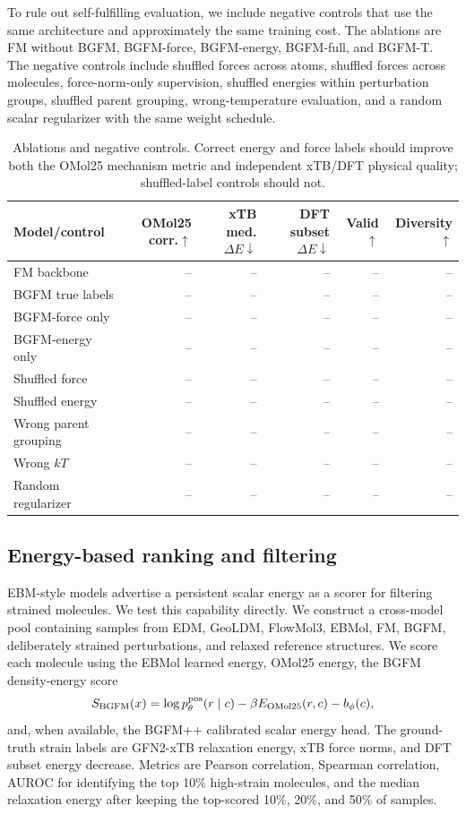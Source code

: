 To rule out self-fulfilling evaluation, we include negative controls that use the same architecture and approximately the same training cost. The ablations are FM without BGFM, BGFM-force, BGFM-energy, BGFM-full, and BGFM-T. The negative controls include shuffled forces across atoms, shuffled forces across molecules, force-norm-only supervision, shuffled energies within perturbation groups, shuffled parent grouping, wrong-temperature evaluation, and a random scalar regularizer with the same weight schedule.

\begin{table}[t]
\centering
\small
\caption{Ablations and negative controls. Correct energy and force labels should improve both the OMol25 mechanism metric and independent xTB/DFT physical quality; shuffled-label controls should not.}
\label{tab:ablation_controls}
\begin{tabular}{lrrrrr}
\toprule
Model/control & OMol25 corr.$\uparrow$ & xTB med. $\Delta E\downarrow$ & DFT subset $\Delta E\downarrow$ & Valid$\uparrow$ & Diversity$\uparrow$ \\
\midrule
FM backbone & -- & -- & -- & -- & -- \\
BGFM true labels & -- & -- & -- & -- & -- \\
BGFM-force only & -- & -- & -- & -- & -- \\
BGFM-energy only & -- & -- & -- & -- & -- \\
Shuffled force & -- & -- & -- & -- & -- \\
Shuffled energy & -- & -- & -- & -- & -- \\
Wrong parent grouping & -- & -- & -- & -- & -- \\
Wrong $kT$ & -- & -- & -- & -- & -- \\
Random regularizer & -- & -- & -- & -- & -- \\
\bottomrule
\end{tabular}
\end{table}

\subsection{Energy-based ranking and filtering}

EBM-style models advertise a persistent scalar energy as a scorer for filtering strained molecules. We test this capability directly. We construct a cross-model pool containing samples from EDM, GeoLDM, FlowMol3, EBMol, FM, BGFM, deliberately strained perturbations, and relaxed reference structures. We score each molecule using the EBMol learned energy, OMol25 energy, the BGFM density-energy score
\[
S_{\rm BGFM}(x) = \log p_\theta^{\mathrm{pos}}(r\mid c) - \beta E_{\rm OMol25}(r,c) - b_\phi(c),
\]
and, when available, the BGFM++ calibrated scalar energy head. The ground-truth strain labels are GFN2-xTB relaxation energy, xTB force norms, and DFT subset energy decrease. Metrics are Pearson correlation, Spearman correlation, AUROC for identifying the top 10\% high-strain molecules, and the median relaxation energy after keeping the top-scored 10\%, 20\%, and 50\% of samples.

